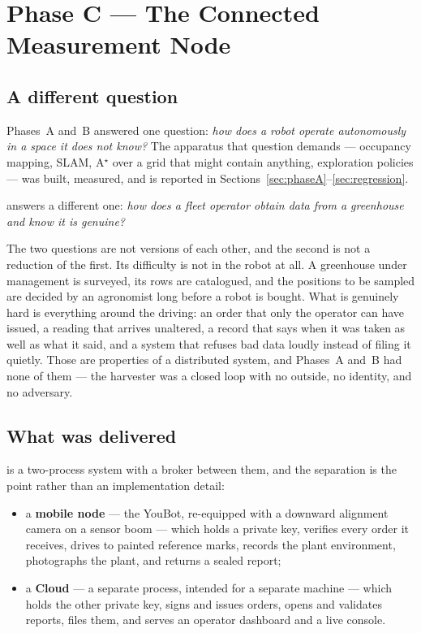 \section{Phase C --- The Connected Measurement Node}
\label{sec:phaseC}

\subsection{A different question}

Phases~A and~B answered one question: \emph{how does a robot operate
autonomously in a space it does not know?} The apparatus that question
demands --- occupancy mapping, SLAM, A$^\star$ over a grid that might
contain anything, exploration policies --- was built, measured, and is
reported in Sections~\ref{sec:phaseA}--\ref{sec:regression}.

\phaseC{} answers a different one: \emph{how does a fleet operator
obtain data from a greenhouse and know it is genuine?}

The two questions are not versions of each other, and the second is not
a reduction of the first. Its difficulty is not in the robot at all. A
greenhouse under management is surveyed, its rows are catalogued, and the
positions to be sampled are decided by an agronomist long before a robot
is bought. What is genuinely hard is everything around the driving: an
order that only the operator can have issued, a reading that arrives
unaltered, a record that says when it was taken as well as what it said,
and a system that refuses bad data loudly instead of filing it quietly.
Those are properties of a distributed system, and Phases~A and~B had
none of them --- the harvester was a closed loop with no outside, no
identity, and no adversary.

\subsection{What was delivered}

\phaseC{} is a two-process system with a broker between them, and the
separation is the point rather than an implementation detail:

\begin{itemize}[leftmargin=*,itemsep=2pt,topsep=3pt]
  \item a \textbf{mobile node} --- the \phaseB{} YouBot, re-equipped
        with a downward alignment camera on a sensor boom --- which
        holds a private key, verifies every order it receives, drives to
        painted reference marks, records the plant environment,
        photographs the plant, and returns a sealed report;
  \item a \textbf{Cloud} --- a separate process, intended for a separate
        machine --- which holds the other private key, signs and issues
        orders, opens and validates reports, files them, and serves an
        operator dashboard and a live console.
\end{itemize}

